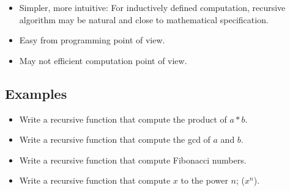 \documentclass[11pt]{article}
\providecommand{\tightlist}{%
      \setlength{\itemsep}{0pt}\setlength{\parskip}{0pt}}
\begin{document}
\begin{itemize}
\tightlist
\item
  Simpler, more intuitive: For inductively defined computation,
  recursive algorithm may be natural and close to mathematical
  specification.
\item
  Easy from programming point of view.
\item
  May not efficient computation point of view.
\end{itemize}

\hypertarget{examples}{%
\subsection{Examples}\label{examples}}

\begin{itemize}
\tightlist
\item
  Write a recursive function that compute the product of \(a*b\).
\item
  Write a recursive function that compute the gcd of \(a\) and \(b\).
\item
  Write a recursive function that compute Fibonacci numbers.
\item
  Write a recursive function that compute \(x\) to the power \(n\);
  (\(x^n\)).
\end{itemize}


    
    
    
\end{document}
